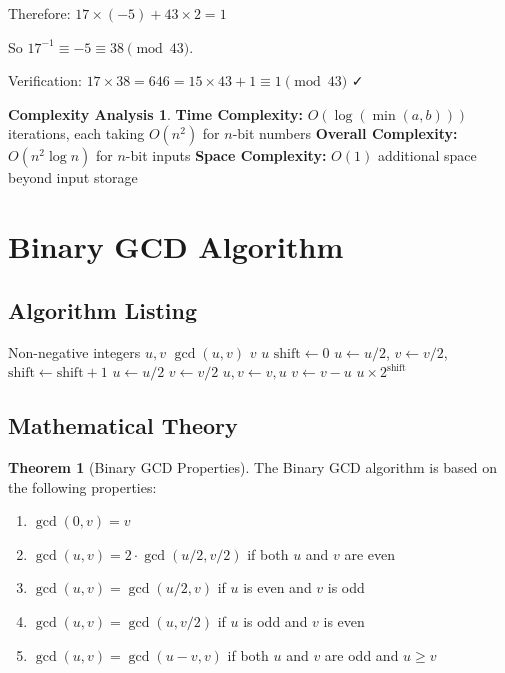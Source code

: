\documentclass[12pt,a4paper]{article}
\theoremstyle{definition}
\newtheorem{theorem}{Theorem}[section]
\newtheorem{complexity}{Complexity Analysis}[section]
\begin{document}
Therefore: $17 \times (-5) + 43 \times 2 = 1$

So $17^{-1} \equiv -5 \equiv 38 \pmod{43}$.

Verification: $17 \times 38 = 646 = 15 \times 43 + 1 \equiv 1 \pmod{43}$ ✓

\begin{complexity}
\textbf{Time Complexity:} $O(\log(\min(a,b)))$ iterations, each taking $O(n^2)$ for $n$-bit numbers
\textbf{Overall Complexity:} $O(n^2 \log n)$ for $n$-bit inputs
\textbf{Space Complexity:} $O(1)$ additional space beyond input storage
\end{complexity}

\section{Binary GCD Algorithm}

\subsection{Algorithm Listing}

\begin{algorithm}[H]
\caption{Binary GCD (Stein's Algorithm)}
\label{alg:binary-gcd}
\begin{algorithmic}[1]
\REQUIRE Non-negative integers $u, v$
\ENSURE $\gcd(u, v)$
    \RETURN $v$
\ENDIF
{}
    \RETURN $u$
\ENDIF
\STATE $\text{shift} \leftarrow 0$
    \STATE $u \leftarrow u / 2$, $v \leftarrow v / 2$, $\text{shift} \leftarrow \text{shift} + 1$
\ENDWHILE
{}
    \STATE $u \leftarrow u / 2$
\ENDWHILE
{}
        \STATE $v \leftarrow v / 2$
    \ENDWHILE
        \STATE $u, v \leftarrow v, u$
    \ENDIF
    \STATE $v \leftarrow v - u$
\ENDWHILE
\RETURN $u \times 2^{\text{shift}}$
\end{algorithmic}
\end{algorithm}

\subsection{Mathematical Theory}

\begin{theorem}[Binary GCD Properties]
The Binary GCD algorithm is based on the following properties:
\begin{enumerate}
    \item $\gcd(0, v) = v$
    \item $\gcd(u, v) = 2 \cdot \gcd(u/2, v/2)$ if both $u$ and $v$ are even
    \item $\gcd(u, v) = \gcd(u/2, v)$ if $u$ is even and $v$ is odd
    \item $\gcd(u, v) = \gcd(u, v/2)$ if $u$ is odd and $v$ is even
    \item $\gcd(u, v) = \gcd(u-v, v)$ if both $u$ and $v$ are odd and $u \geq v$
\end{enumerate}
\end{theorem}
\end{document}

